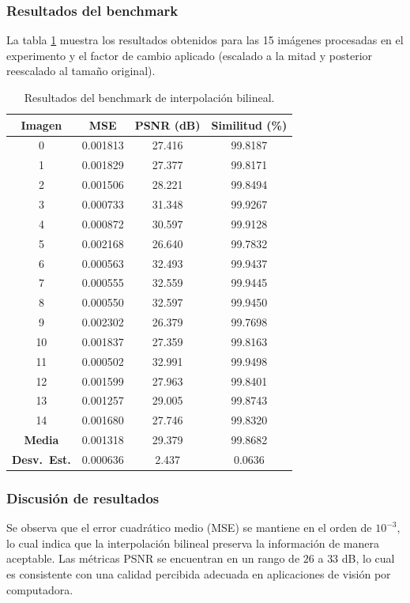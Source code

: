 \documentclass[12pt,a4paper]{article}
\begin{document}
\subsubsection{Resultados del benchmark}
La tabla \ref{tab:bilinear-benchmark} muestra los resultados obtenidos 
para las 15 imágenes procesadas en el experimento y el factor de cambio aplicado 
(escalado a la mitad y posterior reescalado al tamaño original).

\begin{table}[H]
\centering
\caption{Resultados del benchmark de interpolación bilineal.}
\label{tab:bilinear-benchmark}
\begin{tabular}{c|c|c|c}
\hline
Imagen & MSE & PSNR (dB) & Similitud (\%) \\ \hline
0  & 0.001813 & 27.416 & 99.8187 \\
1  & 0.001829 & 27.377 & 99.8171 \\
2  & 0.001506 & 28.221 & 99.8494 \\
3  & 0.000733 & 31.348 & 99.9267 \\
4  & 0.000872 & 30.597 & 99.9128 \\
5  & 0.002168 & 26.640 & 99.7832 \\
6  & 0.000563 & 32.493 & 99.9437 \\
7  & 0.000555 & 32.559 & 99.9445 \\
8  & 0.000550 & 32.597 & 99.9450 \\
9  & 0.002302 & 26.379 & 99.7698 \\
10 & 0.001837 & 27.359 & 99.8163 \\
11 & 0.000502 & 32.991 & 99.9498 \\
12 & 0.001599 & 27.963 & 99.8401 \\
13 & 0.001257 & 29.005 & 99.8743 \\
14 & 0.001680 & 27.746 & 99.8320 \\ \hline
\textbf{Media} & 0.001318 & 29.379 & 99.8682 \\
\textbf{Desv.~Est.} & 0.000636 & 2.437 & 0.0636 \\ \hline
\end{tabular}
\end{table}

\subsubsection{Discusión de resultados}
Se observa que el error cuadrático medio (MSE) se mantiene en el orden de $10^{-3}$, lo cual indica que la interpolación bilineal preserva la información de manera aceptable. Las métricas PSNR se encuentran en un rango de $26$ a $33$ dB, lo cual es consistente con una calidad percibida adecuada en aplicaciones de visión por computadora.  
\end{document}
